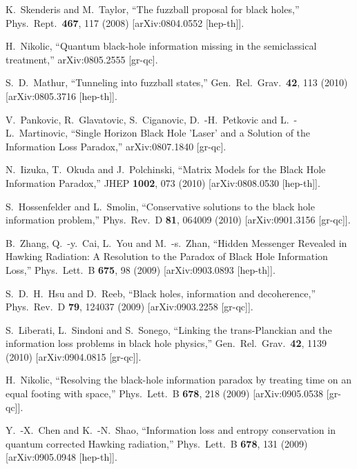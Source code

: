 \documentclass[12pt]{article}
\begin{document}
\begin{thebibliography}{99}
  K.~Skenderis and M.~Taylor,
  ``The fuzzball proposal for black holes,''
  Phys.\ Rept.\  {\bf 467}, 117 (2008)
  [arXiv:0804.0552 [hep-th]].

  H.~Nikolic,
  ``Quantum black-hole information missing in the semiclassical treatment,''
  arXiv:0805.2555 [gr-qc].

  S.~D.~Mathur,
  ``Tunneling into fuzzball states,''
  Gen.\ Rel.\ Grav.\  {\bf 42}, 113 (2010)
  [arXiv:0805.3716 [hep-th]].

  V.~Pankovic, R.~Glavatovic, S.~Ciganovic, D.~-H.~Petkovic and L.~-L.~Martinovic,
  ``Single Horizon Black Hole 'Laser' and a Solution of the Information Loss Paradox,''
  arXiv:0807.1840 [gr-qc].

  N.~Iizuka, T.~Okuda and J.~Polchinski,
  ``Matrix Models for the Black Hole Information Paradox,''
  JHEP {\bf 1002}, 073 (2010)
  [arXiv:0808.0530 [hep-th]].

  S.~Hossenfelder and L.~Smolin,
  ``Conservative solutions to the black hole information problem,''
  Phys.\ Rev.\ D {\bf 81}, 064009 (2010)
  [arXiv:0901.3156 [gr-qc]].

  B.~Zhang, Q.~-y.~Cai, L.~You and M.~-s.~Zhan,
  ``Hidden Messenger Revealed in Hawking Radiation: A Resolution to the Paradox of Black Hole Information Loss,''
  Phys.\ Lett.\ B {\bf 675}, 98 (2009)
  [arXiv:0903.0893 [hep-th]].

  S.~D.~H.~Hsu and D.~Reeb,
  ``Black holes, information and decoherence,''
  Phys.\ Rev.\ D {\bf 79}, 124037 (2009)
  [arXiv:0903.2258 [gr-qc]].

  S.~Liberati, L.~Sindoni and S.~Sonego,
  ``Linking the trans-Planckian and the information loss problems in black hole physics,''
  Gen.\ Rel.\ Grav.\  {\bf 42}, 1139 (2010)
  [arXiv:0904.0815 [gr-qc]].

  H.~Nikolic,
  ``Resolving the black-hole information paradox by treating time on an equal footing with space,''
  Phys.\ Lett.\ B {\bf 678}, 218 (2009)
  [arXiv:0905.0538 [gr-qc]].

  Y.~-X.~Chen and K.~-N.~Shao,
  ``Information loss and entropy conservation in quantum corrected Hawking radiation,''
  Phys.\ Lett.\ B {\bf 678}, 131 (2009)
  [arXiv:0905.0948 [hep-th]].


\end{thebibliography}
\end{document}
